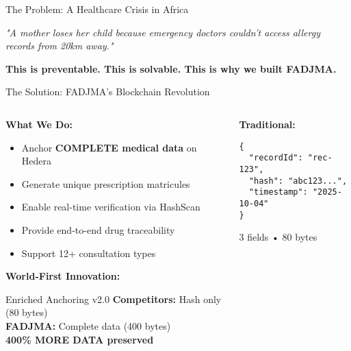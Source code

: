 \documentclass[aspectratio=169,xcolor=dvipsnames,20pt]{beamer}
\newcommand{\checkitem}{\item[\color{SuccessGreen}\faCheckCircle]}
\begin{document}
\begin{frame}{The Problem: A Healthcare Crisis in Africa}
  \vspace{0.3cm}

  \begin{center}
    \textit{\textcolor{DangerRed}{"A mother loses her child because emergency doctors couldn't access allergy records from 20km away."}}

    \textbf{This is preventable. This is solvable. This is why we built FADJMA.}
  \end{center}

\end{frame}

\begin{frame}[fragile,shrink=5]{The Solution: FADJMA's Blockchain Revolution}
\small
  \begin{columns}[T]
    \begin{column}{0.5\textwidth}
      \textbf{What We Do:}
      \begin{itemize}
        \checkitem Anchor \textbf{COMPLETE medical data} on Hedera
        \checkitem Generate unique prescription matricules
        \checkitem Enable real-time verification via HashScan
        \checkitem Provide end-to-end drug traceability
        \checkitem Support 12+ consultation types
      \end{itemize}

      \vspace{0.2cm}

      \textbf{\textcolor{HederaPurple}{World-First Innovation:}}
      \begin{block}{Enriched Anchoring v2.0}
        \small
        \textbf{Competitors:} Hash only (80 bytes) \\
        \textbf{FADJMA:} Complete data (400 bytes) \\
        \textcolor{SuccessGreen}{\textbf{400\% MORE DATA preserved}}
      \end{block}
    \end{column}

    \begin{column}{0.5\textwidth}
      \scriptsize
      \textbf{Traditional:}
      \begin{verbatim}
{
  "recordId": "rec-123",
  "hash": "abc123...",
  "timestamp": "2025-10-04"
}
      \end{verbatim}
      \textcolor{DangerRed}{3 fields • 80 bytes}

      \vspace{0.15cm}


\end{column}
\end{columns}
\end{frame}
\end{document}
